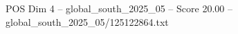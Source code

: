 \begin{textsample}{POS Dim 4 – global\_south\_2025\_05 – Score 20.00 – global\_south\_2025\_05/125122864.txt}
\end{textsample}
